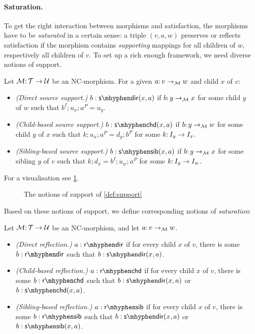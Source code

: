 \paragraph{Saturation.}

To get the right interaction between morphisms and satisfaction, the morphisms have to be \emph{saturated} in a certain sense: a triple $(v,a,w)$ preserves or reflects satisfaction if the morphism contains \emph{supporting} mappings for all children of $w$, respectively all children of $v$. To set up a rich enough framework, we need diverse notions of support.

\begin{definition}\label{def:support}
Let ${\mathcal{M}}{:}\, {\mathcal{T}}\rightarrow{\mathcal{U}}$ be an NC-morphism. For a given $a{:}\, v\rightarrow_{\mathcal{M}} w$ and child $x$ of $v$:
\begin{itemize}[topsep=\smallskipamount]
\item \emph{(Direct source support.)} $\issdir b{x,a}$ if $b{:}\, y\rightarrow_{\mathcal{M}} x$ for some child $y$ of $w$ such that $b^I;u_x;a^P=u_y$.
\item \emph{(Child-based source support.)} $\isschd b{x,a}$ if $b{:}\, y\rightarrow_{\mathcal{M}} w$ for some child $y$ of $x$ such that $k;u_x;a^P=d_y;b^P$ for some $k{:}\, I_y\rightarrow I_x$.
\item \emph{(Sibling-based source support.)} $\isssib b{x,a}$ if $b{:}\, y\rightarrow_{\mathcal{M}} x$ for some sibling $y$ of $v$ such that $k;d_x=b^I;u_w;a^P$ for some $k{:}\, I_y\rightarrow I_w$.
\end{itemize}
\end{definition}
%
For a visualisation see \cref{fig:source-saturation}.
%
\begin{figure}
	
	\caption{The notions of support of \cref{def:support}}
	\label{fig:source-saturation}
\end{figure}
%
Based on these notions of support, we define corresponding notions of \emph{saturation}:

\begin{definition}\label{def:syntactic reflection}
Let ${\mathcal{M}}{:}\, {\mathcal{T}}\rightarrow{\mathcal{U}}$ be an NC-morphism, and let $a{:}\, v\rightarrow_{\mathcal{M}} w$.
\begin{itemize}[topsep=\smallskipamount]
\item \emph{(Direct reflection.)} $a:\rdir$ if for every child $x$ of $v$, there is some $b:\rdir$ such that $\issdir b{x,a}$.
\item \emph{(Child-based reflection.)} $a:\rchd$ if for every child $x$ of $v$, there is some $b:\rchd$ such that $\issdir b{x,a}$ or $\isschd b{x,a}$.
\item \emph{(Sibling-based reflection.)} $a:\rsib$ if for every child $x$ of $v$, there is some $b:\rsib$ such that $\issdir b{x,a}$ or $\isssib b{x,a}$.
\end{itemize}
\end{definition}

